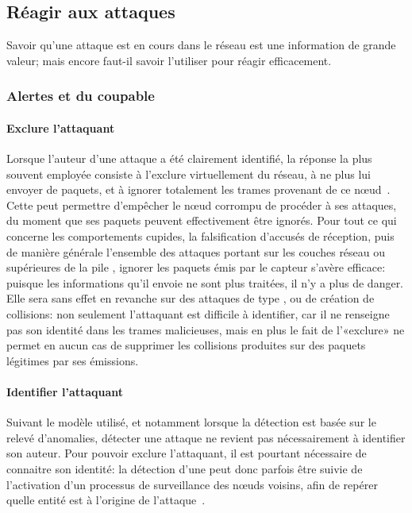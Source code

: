 \subsection{Réagir aux attaques}
Savoir qu'une attaque est en cours dans le réseau est une information de grande valeur; mais encore faut-il savoir l'utiliser pour réagir efficacement.

    \subsubsection{Alertes et  du coupable}
        \paragraph{Exclure l'attaquant}
Lorsque l'auteur d'une attaque a été clairement identifié, la réponse la plus souvent employée consiste à l'exclure virtuellement du réseau, \cad à ne plus lui envoyer de paquets, et à ignorer totalement les trames provenant de ce nœud~\cite{LC08}.
Cette  peut permettre d'empêcher le nœud corrompu de procéder à ses attaques, du moment que ses paquets peuvent effectivement être ignorés.
Pour tout ce qui concerne les comportements cupides, la falsification d'accusés de réception, puis de manière générale l'ensemble des attaques portant sur les couches réseau ou supérieures de la pile \tcpip, ignorer les paquets émis par le capteur s'avère efficace: puisque les informations qu'il envoie ne sont plus traitées, il n'y a plus de danger.
Elle sera sans effet en revanche sur des attaques de type , ou de création de collisions: non seulement l'attaquant est difficile à identifier, car il ne renseigne pas son identité dans les trames malicieuses, mais en plus le fait de l'«exclure» ne permet en aucun cas de supprimer les collisions produites sur des paquets légitimes par ses émissions.

        \paragraph{Identifier l'attaquant}
Suivant le modèle utilisé, et notamment lorsque la détection est basée sur le relevé d'anomalies, détecter une attaque ne revient pas nécessairement à identifier son auteur.
Pour pouvoir exclure l'attaquant, il est pourtant nécessaire de connaitre son identité: la détection d'une  peut donc parfois être suivie de l'activation d'un processus de surveillance des nœuds voisins, afin de repérer quelle entité est à l'origine de l'attaque~\cite{BMS13}.

